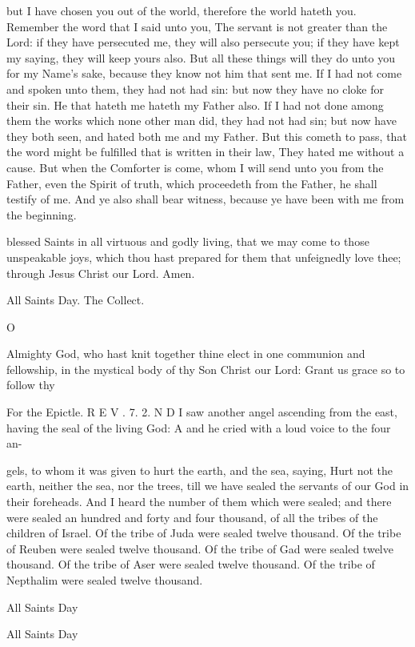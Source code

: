 but I have chosen you out of the world, therefore the world hateth you. Remember the word that I said unto you, The servant is not greater than the Lord: if they have persecuted me, they will also persecute you; if they have kept my saying, they will keep yours also. But all these things will they do unto you for my Name’s sake, because they know not him that sent me. If I had not come and spoken unto them, they had not had sin: but now they have no cloke for their sin. He that hateth me hateth my Father also. If I had not done among them the works which none other man did, they had not had sin; but now have they both seen, and hated both me and my Father. But this cometh to pass, that the word might be fulfilled that is written in their law, They hated me without a cause. But when the Comforter is come, whom I will send unto you from the Father, even the Spirit of truth, which proceedeth from the Father, he shall testify of me. And ye also shall bear witness, because ye have been with me from the beginning.

blessed Saints in all virtuous and godly living, that we may come to those unspeakable joys, which thou hast prepared for them that unfeignedly love thee; through Jesus Christ our Lord. Amen.

All Saints Day. The Collect.

O

Almighty God, who hast knit together thine elect in one communion and fellowship, in the mystical body of thy Son Christ our Lord: Grant us grace so to follow thy

For the Epictle. R E V . 7. 2. N D I saw another angel ascending from the east, having the seal of the living God: A and he cried with a loud voice to the four an-

gels, to whom it was given to hurt the earth, and the sea, saying, Hurt not the earth, neither the sea, nor the trees, till we have sealed the servants of our God in their foreheads. And I heard the number of them which were sealed; and there were sealed an hundred and forty and four thousand, of all the tribes of the children of Israel. Of the tribe of Juda were sealed twelve thousand. Of the tribe of Reuben were sealed twelve thousand. Of the tribe of Gad were sealed twelve thousand. Of the tribe of Aser were sealed twelve thousand. Of the tribe of Nepthalim were sealed twelve thousand.

All Saints Day

All Saints Day

